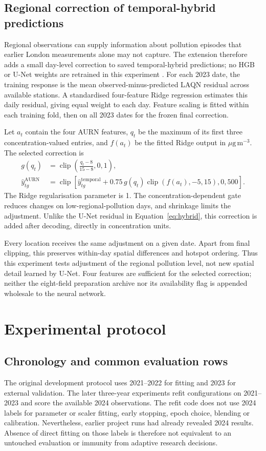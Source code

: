 \documentclass[11pt,a4paper]{article}
\newcommand{\ug}{\ensuremath{\mu\mathrm{g}\,\mathrm{m}^{-3}}}
\begin{document}
\subsection{Regional correction of temporal-hybrid predictions}
\label{sec:aurn-method}
Regional observations can supply information about pollution episodes that
earlier London measurements alone may not capture. The extension therefore
adds a small day-level correction to saved temporal-hybrid predictions; no HGB
or U-Net weights are retrained in this experiment \citep{aitkenaurn2026}.
For each 2023 date, the training response is the mean observed-minus-predicted
LAQN residual across available stations. A standardised four-feature Ridge
regression estimates this daily residual, giving equal weight to each day.
Feature scaling is fitted within each training fold, then on all 2023 dates
for the frozen final correction.

Let $a_t$ contain the four AURN features, $q_t$ be the maximum of its first
three concentration-valued entries, and $f(a_t)$ be the fitted Ridge output
in \ug. The selected correction is
\begin{align}
 g(q_t)&=\operatorname{clip}\!\left(\frac{q_t-8}{15-8},0,1\right),\\
 \widehat y^{\mathrm{AURN}}_{tg}
 &=\operatorname{clip}\!\left[\widehat y^{\mathrm{temporal}}_{tg}
 +0.75\,g(q_t)\operatorname{clip}\!\left(f(a_t),-5,15\right),0,500\right].
 \label{eq:aurn}
\end{align}
The Ridge regularisation parameter is 1. The concentration-dependent gate
reduces changes on low-regional-pollution days, and shrinkage limits the
adjustment. Unlike the U-Net residual in Equation~\ref{eq:hybrid}, this
correction is added after decoding, directly in concentration units.

Every location receives the same adjustment on a given date. Apart from final
clipping, this preserves within-day spatial differences and hotspot ordering.
Thus this experiment tests adjustment of the regional pollution level, not
new spatial detail learned by U-Net. Four features are sufficient for the
selected correction; neither the eight-field preparation archive nor its
availability flag is appended wholesale to the neural network.

\section{Experimental protocol}
\subsection{Chronology and common evaluation rows}
The original development protocol uses 2021--2022 for fitting and 2023 for
external validation. The later three-year experiments refit configurations on
2021--2023 and score the available 2024 observations. The refit code does not
use 2024 labels for parameter or scaler fitting, early stopping, epoch choice,
blending or calibration. Nevertheless, earlier project runs had already
revealed 2024 results. Absence of direct fitting on those labels is therefore
not equivalent to an untouched evaluation or immunity from adaptive research
decisions.
\end{document}
